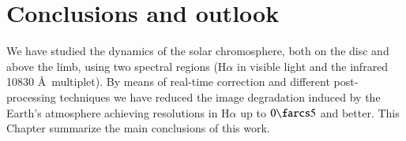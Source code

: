 \chapter{Conclusions and outlook \label{ch:conclusions}}
We have studied the dynamics of the solar chromosphere, both on the disc and above the limb, using two spectral regions (H$\alpha$ in visible light and the infrared  10830 \AA\, multiplet). By means of real-time correction and different post-processing techniques we have reduced the image degradation induced by the Earth's atmosphere achieving resolutions in H$\alpha$ up to $0\farcs5$ and better. This Chapter summarize the main conclusions of this work.


